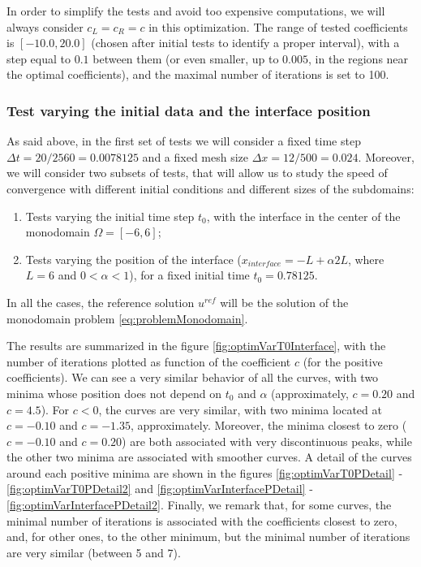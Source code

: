 \indent In order to simplify the tests and avoid too expensive computations, we will always consider $c_L = c_R = c$ in this optimization. The range of tested coefficients is $[-10.0, 20.0]$ (chosen after initial tests to identify a proper interval), with a step equal to  $0.1$ between them (or even smaller, up to $0.005$, in the regions near the optimal coefficients), and the maximal number of iterations is set to 100.

\subsubsection{Test varying the initial data and the interface position}

\indent As said above, in the first set of tests we will consider a fixed time step $\Delta t = 20/2560 = 0.0078125$ and a fixed mesh size $\Delta x = 12/500 = 0.024$. Moreover, we will consider two subsets of tests, that will allow us to study the speed of convergence with different initial conditions and different sizes of the subdomains:

\begin{enumerate}
	\item Tests varying the initial time step $t_0$, with the interface in the center of the monodomain $\Omega = [-6,6]$;
	\item Tests varying the position of the interface ($x_{interface} = -L + \alpha 2L$, where $L = 6$ and $0 < \alpha < 1$), for a fixed initial time $t_0 = 0.78125$.
\end{enumerate}

\indent In all the cases, the reference solution $u^{ref}$ will be the solution of the monodomain problem \eqref{eq:problemMonodomain}.

\indent The results are summarized in the figure \ref{fig:optimVarT0Interface}, with the number of iterations plotted as function of the coefficient $c$ (for the positive coefficients). We can see a very similar behavior of all the curves, with two minima whose position does not depend on $t_0$ and $\alpha$ (approximately, $c = 0.20$ and $c=4.5$). For $c<0$, the curves are very similar, with two minima located at $c = -0.10$ and $c = -1.35$, approximately. Moreover, the minima closest to zero ($c=-0.10$ and $c = 0.20$) are both associated with very discontinuous peaks, while the other two minima are associated with smoother curves. A detail of the curves around each positive minima are shown in the figures \ref{fig:optimVarT0PDetail} - \ref{fig:optimVarT0PDetail2} and \ref{fig:optimVarInterfacePDetail} - \ref{fig:optimVarInterfacePDetail2}. Finally, we remark that, for some curves, the minimal number of iterations is associated with the coefficients closest to zero, and, for other ones, to the other minimum, but the minimal number of iterations are very similar (between 5 and 7).

